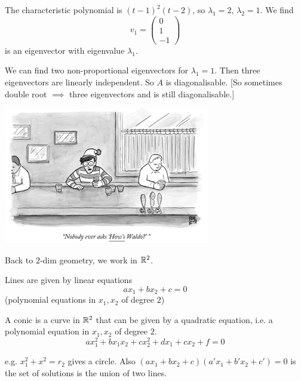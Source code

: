 \documentclass[10pt]{scrartcl}
\begin{document}
\begin{examples}
The characteristic polynomial is $(t-1)^2(t-2)$, so $\lambda_1 = 2,\, \lambda_2 = 1$. We find
\[
  v_1 = \begin{pmatrix}
 0 \\ 1 \\ -1	
 \end{pmatrix}
\]
is an eigenvector with eigenvalue $\lambda_1$. 

We can find two non-proportional eigenvectors for $\lambda_1 = 1$. Then three eigenvectors are linearly independent. So $A$ is diagonalisable. [So sometimes double root $\implies$ three eigenvectors and is still diagonalisable.] 

\end{examples}
\vspace*{1cm}




\begin{center}
\includegraphics[width=9cm]{cartoon2.png}	
\end{center}






Back to $2$-dim geometry, we work in $\mathbb{R}^2$. 

Lines are given by linear equations
\[
  ax_1 + bx_2 + c = 0
\]
(polynomial equations in $x_1,x_2$ of degree $2$)\\


\begin{definition}
A conic is a curve in $\mathbb{R}^2$ that can be given by a quadratic equation, i.e. a polynomial equation in $x_1,x_2$ of degree $2$.
\[
  ax_1^2 + bx_1x_2 + cx_2^2 + dx_1 + cx_2 + f = 0
\]
\end{definition}

e.g. $x_1^2 + x^2 = r_2$ gives a circle. Also $(ax_1 + bx_2 + c)(a'x_1 + b'x_2 + c') = 0$ is the set of solutions is the union of two lines. 

\end{document}
